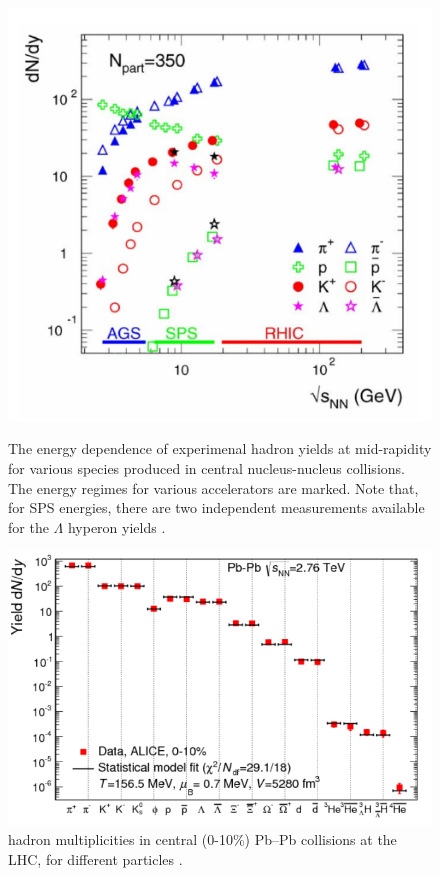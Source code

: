 \documentclass[12pt,a4paper]{book}
\begin{document}
	\begin{figure}
		\centering
			\centering
			\includegraphics[width=0.8 \linewidth]{pictures/hadron_yelds.png}
			\caption{ The energy dependence of experimenal hadron yields at	mid-rapidity for various species produced in central nucleus-nucleus collisions. The energy regimes for various accelerators are marked. Note that, for SPS energies, there are two independent measurements available for the $\Lambda$ hyperon yields \cite{Andronic_2006}.}
			\label{fig:hadron_yelds}
			\centering
			\includegraphics[width=0.8 \linewidth]{pictures/particle_abbundance.png}
			\caption{hadron multiplicities in central (0-10\%) Pb–Pb collisions at the LHC, for different particles \cite{Andronic_2017}.}
			\label{fig:particle_abbundance}
	\end{figure}
	
\end{document}
